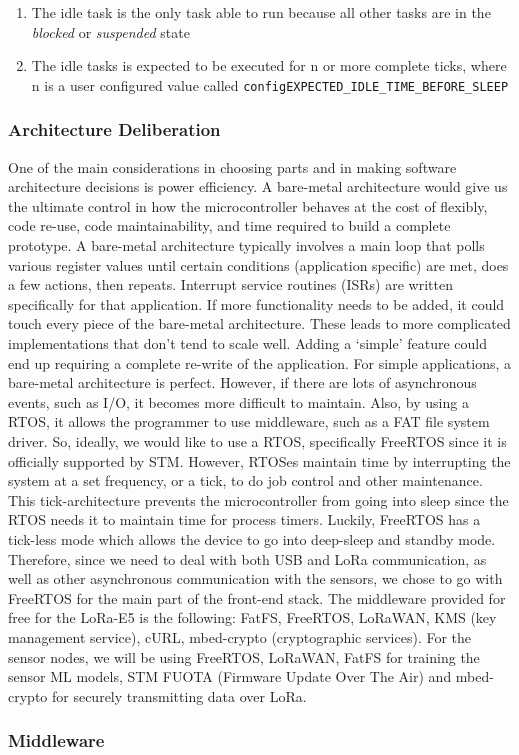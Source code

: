 \begin{enumerate}
	\item The idle task is the only task able to run because all other tasks are
		in the \emph{blocked} or \emph{suspended} state
	\item The idle tasks is expected to be executed for n or more complete ticks,
		where n is a user configured value called
		\texttt{configEXPECTED\_IDLE\_TIME\_BEFORE\_SLEEP}
\end{enumerate}

\subsubsection{Architecture Deliberation}
One of the main considerations in choosing parts and in making software
architecture decisions is power efficiency. A bare-metal architecture would
give us the ultimate control in how the microcontroller behaves at the cost of
flexibly, code re-use, code maintainability, and time required to build a
complete prototype. A bare-metal architecture typically involves a main loop
that polls various register values until certain conditions (application
specific) are met, does a few actions, then repeats. Interrupt service routines
(ISRs) are written specifically for that application. If more functionality
needs to be added, it could touch every piece of the bare-metal architecture.
These leads to more complicated implementations that don't tend to scale well.
Adding a `simple' feature could end up requiring a complete re-write of the
application.  For simple applications, a bare-metal architecture is perfect.
However, if there are lots of asynchronous events, such as I/O, it becomes more
difficult to maintain. Also, by using a RTOS, it allows the programmer to use
middleware, such as a FAT file system driver. So, ideally, we would like to use
a RTOS, specifically FreeRTOS since it is officially supported by STM. However,
RTOSes maintain time by interrupting the system at a set frequency, or a tick,
to do job control and other maintenance.  This tick-architecture prevents the
microcontroller from going into sleep since the RTOS needs it to maintain time
for process timers. Luckily, FreeRTOS has a tick-less mode which allows the
device to go into deep-sleep and standby mode. Therefore, since we need to deal
with both USB and LoRa communication, as well as other asynchronous
communication with the sensors, we chose to go with FreeRTOS for the main part
of the front-end stack. The middleware provided for free for the LoRa-E5 is the
following: FatFS, FreeRTOS, LoRaWAN, KMS (key management service), cURL,
mbed-crypto (cryptographic services). For the sensor nodes, we will be using
FreeRTOS, LoRaWAN, FatFS for training the sensor ML models, STM FUOTA (Firmware
Update Over The Air) and mbed-crypto for securely transmitting data over LoRa.

\subsubsection{Middleware}
